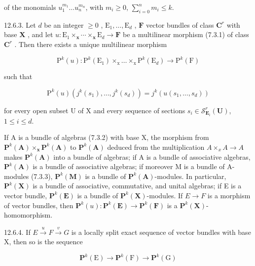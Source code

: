 of the monomials \(u_{1}^{m_1} \ldots u_{n}^{m_n}\), with \(m_i \geqslant 0\), \(\sum_{i=0}^{n} m_i \leqslant k\).

12.6.3. Let \(d\) be an integer \(\geqslant 0\) , \(\mathrm{E}_{1},\ldots,\mathrm{E}_{d}\) , \(\mathbf{F}\) vector bundles of class \(\mathbf{C}^{r}\) with base \(\mathbf{X}\) , and let \(u\colon\mathrm{E}_{1}\times_{\mathbf{x}}\cdots\times_{\mathbf{x}}\mathrm{E}_{d}\to\mathbf{F}\) be a multilinear morphism (7.3.1) of class \(\mathbf{C}^{r}\) . Then there exists a unique multilinear morphism

\[
\mathrm{P} ^ {k} (u) \colon \mathrm{P} ^ {k} (\mathrm{E} _ {1}) \times_ {\mathrm{x}} \dots \times_ {\mathrm{x}} \mathrm{P} ^ {k} (\mathrm{E} _ {d}) \rightarrow \mathrm{P} ^ {k} (\mathrm{F})
\]

such that

\[
\mathrm{P} ^ {k} (u) \left(j ^ {k} \left(s _ {1}\right), \dots , j ^ {k} \left(s _ {d}\right)\right) = j ^ {k} \left(u \left(s _ {1}, \dots , s _ {d}\right)\right)
\]

for every open subset U of X and every sequence of sections \(s_i \in \mathcal{S}_{\mathbf{E}_i}^r(\mathbf{U})\), \(1 \leqslant i \leqslant d\).

If A is a bundle of algebras (7.3.2) with base X, the morphism from \(\mathbf{P}^{k}(\mathbf{A}) \times_{\mathbf{x}} \mathbf{P}^{k}(\mathbf{A})\) to \(\mathbf{P}^{k}(\mathbf{A})\) deduced from the multiplication \(A \times_{x} A \to A\) makes \(\mathbf{P}^{k}(\mathbf{A})\) into a bundle of algebras; if A is a bundle of associative algebras, \(\mathbf{P}^{k}(\mathbf{A})\) is a bundle of associative algebras; if moreover M is a bundle of A-modules (7.3.3), \(\mathbf{P}^{k}(\mathbf{M})\) is a bundle of \(\mathbf{P}^{k}(\mathbf{A})\)-modules. In particular, \(\mathbf{P}^{k}(\mathbf{X})\) is a bundle of associative, commutative, and unital algebras; if E is a vector bundle, \(\mathbf{P}^{k}(\mathbf{E})\) is a bundle of \(\mathbf{P}^{k}(\mathbf{X})\)-modules. If \(E \to F\) is a morphism of vector bundles, then \(\mathbf{P}^{k}(u): \mathbf{P}^{k}(\mathbf{E}) \to \mathbf{P}^{k}(\mathbf{F})\) is a \(\mathbf{P}^{k}(\mathbf{X})\)-homomorphism.

12.6.4. If \(E \xrightarrow{u} F \xrightarrow{v} G\) is a locally split exact sequence of vector bundles with base X, then so is the sequence

\[
\mathbf {P} ^ {k} (\mathrm{E}) \rightarrow \mathbf {P} ^ {k} (\mathrm{F}) \rightarrow \mathbf {P} ^ {k} (\mathrm{G})
\]

